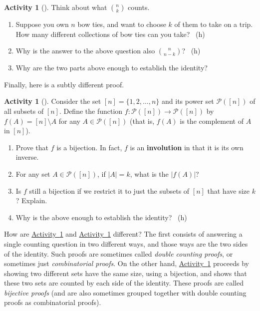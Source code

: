\documentclass[10pt,]{book}
\newcommand{\terminology}[1]{\textbf{#1}}
\theoremstyle{plain}
\theoremstyle{definition}
\theoremstyle{definition}
\theoremstyle{definition}
\newtheorem{activity}[project]{Activity}
\numberwithin{equation}{chapter}
\def\pow{\mathcal P}
\newcommand{\card}[1]{\left| #1 \right|}
\begin{document}
\begin{activity}[]\label{act-pascalsym-dc}
\hypertarget{p-557}{}%
Think about what \(\binom{n}{k}\) counts.%
\begin{enumerate}[font=\bfseries,label=(\alph*),ref=\alph*]
\item\label{task-102} \hypertarget{p-558}{}%
Suppose you own \(n\) bow ties, and want to choose \(k\) of them to take on a trip.  How many different collections of bow ties can you take?%
~{\tiny (h)}\item\label{task-103} \hypertarget{p-560}{}%
Why is the answer to the above question also \(\binom{n}{n-k}\)?%
~{\tiny (h)}\item\label{task-104} \hypertarget{p-562}{}%
Why are the two parts above enough to establish the identity?%
\end{enumerate}
\end{activity}
\hypertarget{p-563}{}%
Finally, here is a subtly different proof.%
\begin{activity}[]\label{act-pascalsym-bij}
\hypertarget{p-564}{}%
Consider the set \([n] = \{1,2,\ldots,n\}\) and its power set \(\pow([n])\) of all subsets of \([n]\).  Define the function \(f:\pow([n]) \to \pow([n])\) by \(f(A) = [n]\setminus A\) for any \(A \in \pow([n])\) (that is, \(f(A)\) is the complement of \(A\) in \([n]\)).%
\begin{enumerate}[font=\bfseries,label=(\alph*),ref=\alph*]
\item\label{task-105} \hypertarget{p-565}{}%
Prove that \(f\) is a bijection.  In fact, \(f\) is an \terminology{involution} in that it is its own inverse.%
\item\label{task-106} \hypertarget{p-566}{}%
For any set \(A \in \pow([n])\), if \(\card{A} = k\), what is the \(\card{f(A)}\)?%
\item\label{task-107} \hypertarget{p-567}{}%
Is \(f\) still a bijection if we restrict it to just the subsets of \([n]\) that have size \(k\)?  Explain.%
\item\label{task-108} \hypertarget{p-568}{}%
Why is the above enough to establish the identity?%
~{\tiny (h)}\end{enumerate}
\end{activity}
\hypertarget{p-570}{}%
How are \hyperref[act-pascalsym-dc]{Activity~\ref{act-pascalsym-dc}} and \hyperref[act-pascalsym-bij]{Activity~\ref{act-pascalsym-bij}} different?  The first consists of answering a single counting question in two different ways, and those ways are the two sides of the identity.  Such proofs are sometimes called \emph{double counting proofs}, or sometimes just \emph{combinatorial proofs}.  On the other hand, \hyperref[act-pascalsym-bij]{Activity~\ref{act-pascalsym-bij}} proceeds by showing two different sets have the same size, using a bijection, and shows that these two sets are counted by each side of the identity.  These proofs are called \emph{bijective proofs} (and are also sometimes grouped together with double counting proofs as combinatorial proofs).%
\end{document}
